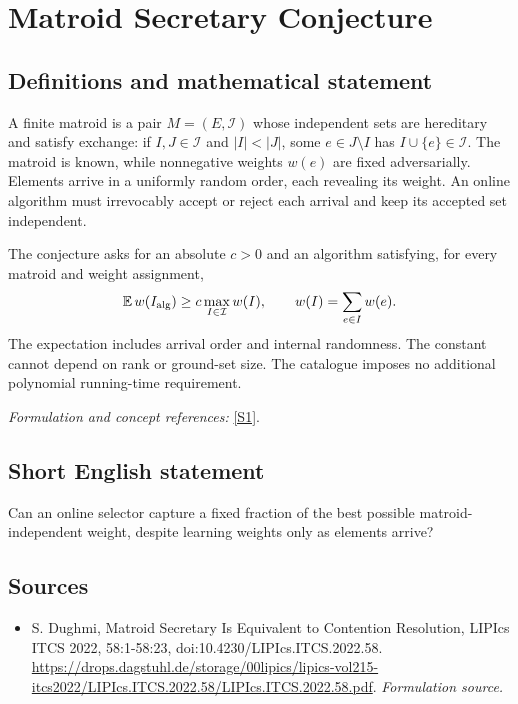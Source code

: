 \documentclass[11pt]{article}
\begin{document}
\section*{\texorpdfstring{Matroid Secretary Conjecture}{Matroid Secretary Conjecture}}\label{30006930}
\subsection{Definitions and mathematical statement}
A finite matroid is a pair $M=(E,\mathcal I)$ whose independent sets are hereditary and satisfy exchange: if $I,J\in\mathcal I$ and $|I|<|J|$, some $e\in J\setminus I$ has $I\cup\{e\}\in\mathcal I$. The matroid is known, while nonnegative weights $w(e)$ are fixed adversarially. Elements arrive in a uniformly random order, each revealing its weight. An online algorithm must irrevocably accept or reject each arrival and keep its accepted set independent.

The conjecture asks for an absolute $c>0$ and an algorithm satisfying, for every matroid and weight assignment,
\[
 {\mathbb{E}}\,w(I_{\rm alg})\ge c\max_{I\in\mathcal I}w(I),
 \qquad w(I)=\sum_{e\in I}w(e).
\]
The expectation includes arrival order and internal randomness. The constant cannot depend on rank or ground-set size. The catalogue imposes no additional polynomial running-time requirement.
\par\smallskip\textit{Formulation and concept references:} \href{https://drops.dagstuhl.de/storage/00lipics/lipics-vol215-itcs2022/LIPIcs.ITCS.2022.58/LIPIcs.ITCS.2022.58.pdf}{[S1]}.

\subsection{Short English statement}
Can an online selector capture a fixed fraction of the best possible matroid-independent weight, despite learning weights only as elements arrive?
\subsection{Sources}
\begin{itemize}
\item[S1]S. Dughmi, Matroid Secretary Is Equivalent to Contention Resolution, LIPIcs ITCS 2022, 58:1-58:23, doi:10.4230/LIPIcs.ITCS.2022.58.
\url{https://drops.dagstuhl.de/storage/00lipics/lipics-vol215-itcs2022/LIPIcs.ITCS.2022.58/LIPIcs.ITCS.2022.58.pdf}.
\textit{Formulation source.}
\end{itemize}
\end{document}
